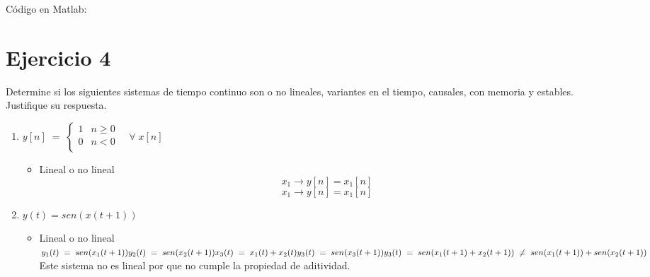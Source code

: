 \documentclass[10pt,a4paper]{report}
\begin{document}
\begin{enumerate}
Código en Matlab:
    
    
\end{enumerate}

\section{Ejercicio 4}
Determine si los siguientes sistemas de tiempo continuo son o no lineales, variantes en el tiempo, causales, con memoria y estables. Justifique su respuesta.
\begin{enumerate}
  \item  $ y\left[n\right]\;=\;\left\{\begin{array}{lc}
                                     1&n\geq0 \\
                                     0&n<0 \\ 
                                   \end{array}\right. \quad \forall\;x\left[n\right]
$\\
    \begin{itemize}
      \item Lineal o no lineal\\
      \[ x_1 \rightarrow  y[n] = x_1[n] \]
      \[ x_1 \rightarrow  y[n] = x_1[n] \]
    \end{itemize}
  \item $y(t)=sen(x(t+1)) $
  \begin{itemize}
    \item Lineal o no lineal\\
$ y_1(t)\;=\;sen(x_1(t+1))\\
  y_2(t)\;=\;sen(x_2(t+1))\\
  x_3(t)\;=\;x_1(t)+x_2(t)\\
  y_3(t)\;=\;sen(x_3(t+1))\\
  y_3(t)\;=\;sen(x_1(t+1)+x_2(t+1))\;\neq\;sen(x_1(t+1))+sen(x_2(t+1))
$\\
  \newline Este sistema no es lineal por que no cumple la propiedad de aditividad.


\end{itemize}
\end{enumerate}
\end{document}
